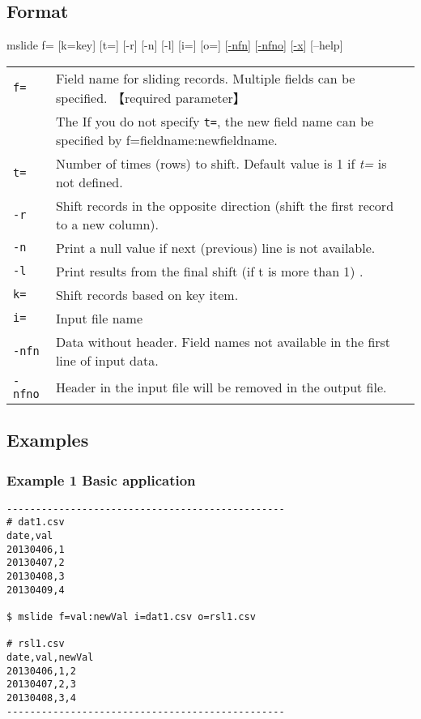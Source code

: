 \documentclass[a4paper]{jarticle}
\begin{document}
\subsection*{Format}

mslide f= [k=key] [t=] [-r] [-n] [-l] [i=] [o=] [\href{run:nfn.pdf}{-nfn}] [\href{run:nfno.pdf}{-nfno}] [\href{run:x.pdf}{-x}] [--help]

\begin{table}[htbp]
{\small
\begin{tabular}{ll}
\verb|f=|    & Field name for sliding records. Multiple fields can be specified. 【required parameter】 \\
             & The If you do not specify \verb|t=|, the new field name can be specified by f=fieldname:newfieldname. \\
\verb|t=|    & Number of times (rows) to shift. Default value is 1 if \emph{t=} is not defined. \\
\verb|-r|    & Shift records in the opposite direction (shift the first record to a new column).\\
\verb|-n|    & Print a null value if next (previous) line is not available. \\
\verb|-l|    & Print results from the final shift (if t is more than 1) .\\
\verb|k=|    & Shift records based on key item. \\
\verb|i=|    & Input file name \\
\verb|-nfn|  & Data without header.  Field names not available in the first line of input data.  \\
\verb|-nfno| & Header in the input file will be removed in the output file. \\
\end{tabular} 
}
\end{table} 

\subsection*{Examples}
\subsubsection*{Example 1 Basic application}

\begin{verbatim}
------------------------------------------------
# dat1.csv
date,val
20130406,1
20130407,2
20130408,3
20130409,4

$ mslide f=val:newVal i=dat1.csv o=rsl1.csv

# rsl1.csv
date,val,newVal
20130406,1,2
20130407,2,3
20130408,3,4
------------------------------------------------
\end{verbatim}
\end{document}
